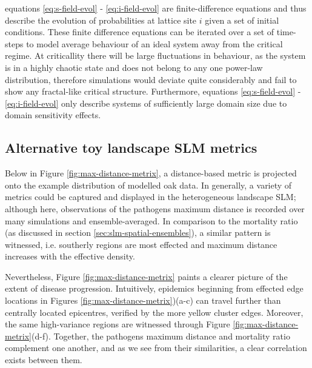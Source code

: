 equations \ref{eq:s-field-evol} - \ref{eq:i-field-evol} are finite-difference equations and thus describe the evolution of probabilities at lattice site $i$ given a set of initial conditions. These finite difference equations can be iterated over a set of time-steps to model average behaviour of an ideal system away from the critical regime. At criticallity there will be large fluctuations in behaviour, as the system is in a highly chaotic state and does not belong to any one power-law distribution, therefore simulations would deviate quite considerably and fail to show any fractal-like critical structure. Furthermore, equations \ref{eq:s-field-evol} - \ref{eq:i-field-evol} only describe systems of sufficiently large domain size due to domain sensitivity effects.

\subsection{Alternative toy landscape SLM metrics}
\label{a:landscape-toy-model}
Below in Figure \ref{fig:max-distance-metrix}, a distance-based metric is projected onto the example distribution of modelled oak data.
In generally, a variety of metrics could be captured and displayed in the heterogeneous landscape SLM;
although here, observations of the pathogens maximum distance is recorded over many simulations and ensemble-averaged.
In comparison to the mortality ratio (as discussed in section \ref{sec:slm-spatial-ensembles}), a similar pattern is witnessed,
i.e. southerly regions are most effected and maximum distance increases with the effective density.

Nevertheless, Figure \ref{fig:max-distance-metrix} paints a clearer picture of the extent of disease progression.
Intuitively, epidemics beginning from effected edge locations in Figures \ref{fig:max-distance-metrix})(a-c) can
travel further than centrally located epicentres, verified by the more yellow cluster edges.
Moreover, the same high-variance regions are witnessed through Figure \ref{fig:max-distance-metrix}(d-f).
Together, the pathogens maximum distance and mortality ratio complement one another, and 
as we see from their similarities, a clear correlation exists between them.

